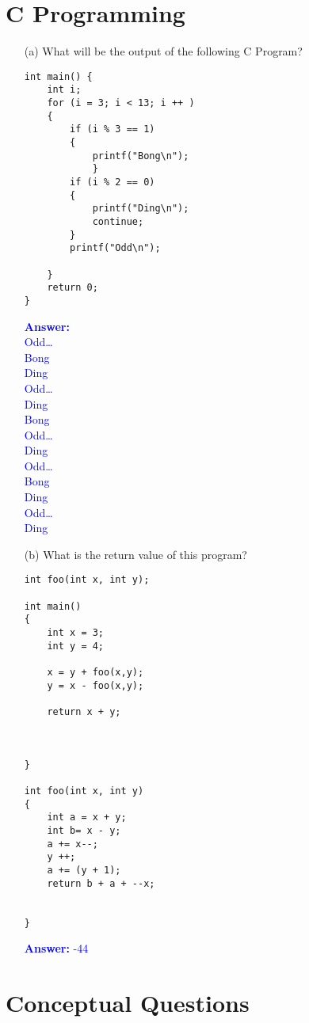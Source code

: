 \documentclass{article}
\begin{document}
\section{C Programming}
\begin{enumerate}
    \item[(a)] What will be the output of the following C Program?
    \begin{lstlisting}[style=CStyle]
int main() {
	int i;
	for (i = 3; i < 13; i ++ )
	{
		if (i % 3 == 1)
		{
			printf("Bong\n");	  		
            }
		if (i % 2 == 0)
		{
			printf("Ding\n");
			continue;
		}
		printf("Odd\n");
		
	}
	return 0;
}
    \end{lstlisting}

    \textcolor{blue}{\textbf{Answer: }\\ Odd… \\
		Bong\\
		Ding\\
		Odd…\\
		Ding\\
		Bong\\
		Odd…\\
		Ding\\
		Odd…\\
		Bong\\
		Ding\\
		Odd…\\
		Ding\\
}
    \item[(b)] What is the return value of this program?
    \begin{lstlisting}[style=CStyle]
int foo(int x, int y);

int main()
{
	int x = 3;
	int y = 4;

	x = y + foo(x,y); 
	y = x - foo(x,y); 
			
	return x + y;



}

int foo(int x, int y)
{
	int a = x + y;
	int b= x - y;
	a += x--;
	y ++;
	a += (y + 1);
	return b + a + --x;


}

    \end{lstlisting}

    \textcolor{blue}{\textbf{Answer: } -44}

\end{enumerate}
\section{Conceptual Questions}
\end{document}
